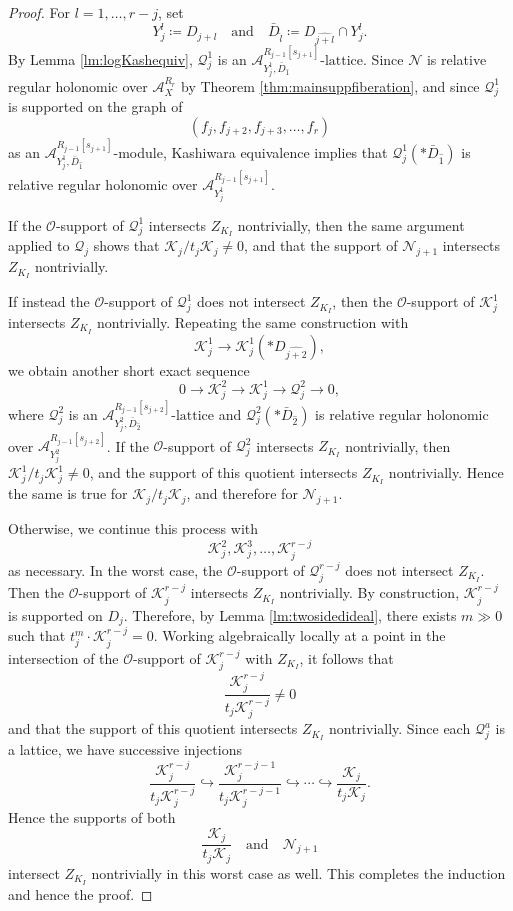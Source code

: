 \documentclass[10pt,a4paper]{amsart}
\newcommand{\cK}{\mathcal{K}}
\newcommand{\cN}{\mathcal{N}}
\newcommand{\cO}{\mathscr{O}}
\newcommand{\cQ}{\mathcal{Q}}
\newcommand{\sA}{\mathscr{A}}
\begin{document}
\begin{proof}
For $l=1,\dots,r-j$, set
\[
Y_j^l\coloneqq D_{j+l}
\quad \text{and} \quad
\bar D_{\widehat l}\coloneqq D_{\widehat{j+l}}\cap Y_j^l.
\]
By Lemma \ref{lm:logKashequiv}, $\cQ_j^1$ is an
$\sA_{Y_j^1,\bar D_{\widehat 1}}^{R_{j-1}[s_{j+1}]}\text{-lattice}.$
Since $\cN$ is relative regular holonomic over $\sA_X^{R_r}$ by
Theorem \ref{thm:mainsuppfiberation}, and since $\cQ_j^1$ is supported on the
graph of
\[
(f_j,f_{j+2},f_{j+3},\dots,f_r)
\]
as an $\sA_{Y_j^1,\bar D_{\widehat 1}}^{R_{j-1}[s_{j+1}]}$-module, Kashiwara
equivalence implies that
$\cQ_j^1(*\bar D_{\widehat 1})$
is relative regular holonomic over
$\sA_{Y_j^1}^{R_{j-1}[s_{j+1}]}.$

If the $\cO$-support of $\cQ_j^1$ intersects $Z_{K_I}$ nontrivially, then the
same argument applied to $\cQ_j$ shows that
${\cK_j}/{t_j\cK_j}\neq 0$,
and that the support of $\cN_{j+1}$ intersects $Z_{K_I}$ nontrivially.

If instead the $\cO$-support of $\cQ_j^1$ does not intersect $Z_{K_I}$, then
the $\cO$-support of $\cK_j^1$ intersects $Z_{K_I}$ nontrivially. Repeating
the same construction with
\[
\cK_j^1\to \cK_j^1(*D_{\widehat{j+2}}),
\]
we obtain another short exact sequence
\[
0
\to
\cK_j^2
\to
\cK_j^1
\to
\cQ_j^2
\to
0,
\]
where $\cQ_j^2$ is an
$\sA_{Y_j^2,\bar D_{\widehat 2}}^{R_{j-1}[s_{j+2}]}\text{-lattice}$
and
$\cQ_j^2(*\bar D_{\widehat 2})$
is relative regular holonomic over
$\sA_{Y_j^2}^{R_{j-1}[s_{j+2}]}$.
If the $\cO$-support of $\cQ_j^2$ intersects $Z_{K_I}$ nontrivially, then
${\cK_j^1}/{t_j\cK_j^1}\neq 0$,
and the support of this quotient intersects $Z_{K_I}$ nontrivially. Hence the
same is true for $\cK_j/t_j\cK_j$, and therefore for $\cN_{j+1}$.

Otherwise, we continue this process with
\[
\cK_j^2,\cK_j^3,\dots,\cK_j^{r-j}
\]
as necessary. In the worst case, the $\cO$-support of $\cQ_j^{r-j}$ does not
intersect $Z_{K_I}$. Then the $\cO$-support of $\cK_j^{r-j}$ intersects
$Z_{K_I}$ nontrivially. By construction, $\cK_j^{r-j}$ is supported on
$D_j$. Therefore, by Lemma \ref{lm:twosidedideal}, there exists $m\gg 0$ such
that
$t_j^m\cdot \cK_j^{r-j}=0$.
Working algebraically locally at a point in the intersection of the
$\cO$-support of $\cK_j^{r-j}$ with $Z_{K_I}$, it follows that
\[
\frac{\cK_j^{r-j}}{t_j\cK_j^{r-j}}\neq 0
\]
and that the support of this quotient intersects $Z_{K_I}$ nontrivially.
Since each $\cQ_j^a$ is a lattice, we have successive injections
\[
\frac{\cK_j^{r-j}}{t_j\cK_j^{r-j}}
\hookrightarrow
\frac{\cK_j^{r-j-1}}{t_j\cK_j^{r-j-1}}
\hookrightarrow
\cdots
\hookrightarrow
\frac{\cK_j}{t_j\cK_j}.
\]
Hence the supports of both
\[
\frac{\cK_j}{t_j\cK_j}
\quad \text{and} \quad
\cN_{j+1}
\]
intersect $Z_{K_I}$ nontrivially in this worst case as well. This completes
the induction and hence the proof.
\end{proof}
\end{document}
